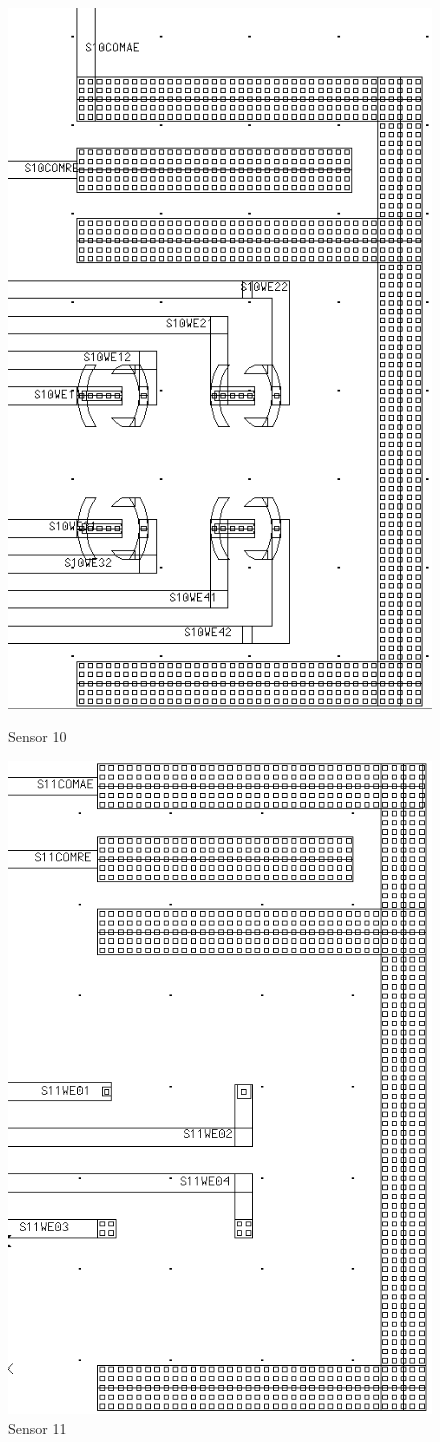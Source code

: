 \begin{description}
\begin{figure}
	\begin{minipage}{0.5\linewidth}
		\centering
		\includegraphics[width=0.6\linewidth]{figures/s10.png}
		\caption{Sensor 10}
		\label{s10}
	\end{minipage}
	\begin{minipage}{0.5\linewidth}
		\centering
		\includegraphics[width=0.6\linewidth]{figures/s11.png}
		\caption{Sensor 11}
		\label{s11}
	\end{minipage}
\end{figure}


\end{description}
